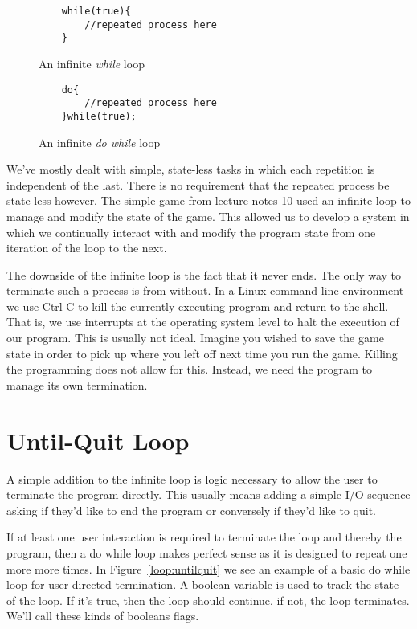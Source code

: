 \documentclass[]{tufte-handout}
\begin{document}
\begin{figure}
\begin{lstlisting}
	while(true){
		//repeated process here
	}
\end{lstlisting}
\label{loop:infWhile}
\caption{An infinite \textit{while} loop}
\end{figure}

\begin{figure}
  \begin{lstlisting}
  	do{
  		//repeated process here
  	}while(true);
  \end{lstlisting}
\caption{An infinite \textit{do while} loop}
\label{loop:infDoWhile}
\end{figure}

We've mostly dealt with simple, state-less tasks in which each repetition is independent of the last. There is no requirement that the repeated process be state-less however.  The simple game from lecture notes 10 used an infinite loop to manage and modify the state of the game.  This allowed us to develop a system in which we continually interact with and modify the program state from one iteration of the loop to the next.

The downside of the infinite loop is the fact that it never ends. The only way to terminate such a process is from without. In a Linux command-line environment we use Ctrl-C to kill the currently executing program and return to the shell. That is, we use interrupts at the operating system level to halt the execution of our program. This is usually not ideal. Imagine you wished to save the game state in order to pick up where you left off next time you run the game. Killing the programming does not allow for this. Instead, we need the program to manage its own termination.

\section{Until-Quit Loop}

A simple addition to the infinite loop is logic necessary to allow the user to terminate the program directly. This usually means adding a simple I/O sequence asking if they'd like to end the program or conversely if they'd like to quit.

If at least one user interaction is required to terminate the loop and thereby the program, then a do while loop makes perfect sense as it is designed to repeat one more more times.  In Figure~\ref{loop:untilquit} we see an example of a basic do while loop for user directed termination. A boolean variable is used to track the state of the loop. If it's true, then the loop should continue, if not, the loop terminates. We'll call these kinds of booleans flags.
\end{document}
